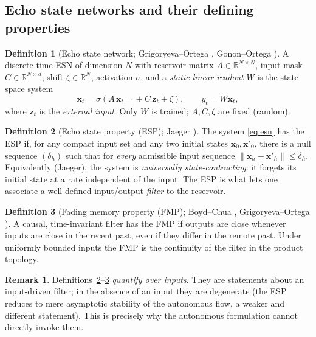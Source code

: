 \documentclass[11pt]{article}
\theoremstyle{definition}
\newtheorem{definition}{Definition}[section]
\newtheorem{remark}{Remark}[section]
\theoremstyle{plain}
\newcommand{\R}{\mathbb{R}}
\begin{document}
\subsection{Echo state networks and their defining properties}

\begin{definition}[Echo state network; Grigoryeva--Ortega \cite{grigoryeva2018}, Gonon--Ortega \cite{gonon2021}]
\label{def:esn}
A discrete-time ESN of dimension $N$ with reservoir matrix $A\in\R^{N\times N}$, input mask $C\in\R^{N\times d}$, shift $\zeta\in\R^N$, activation $\sigma$, and a \emph{static linear readout} $W$ is the state-space system
\begin{equation}
\label{eq:esn}
\mathbf{x}_t = \sigma\!\left(A\,\mathbf{x}_{t-1} + C\,\mathbf{z}_t + \zeta\right),\qquad
y_t = W\mathbf{x}_t,
\end{equation}
where $\mathbf{z}_t$ is the \emph{external input}. Only $W$ is trained; $A,C,\zeta$ are fixed (random).
\end{definition}

\begin{definition}[Echo state property (ESP); Jaeger \cite{jaeger2001}]
\label{def:esp}
The system \eqref{eq:esn} has the ESP if, for any compact input set and any two initial states $\mathbf{x}_0,\mathbf{x}'_0$, there is a null sequence $(\delta_h)$ such that for \emph{every} admissible input sequence $\|\mathbf{x}_h-\mathbf{x}'_h\|\le\delta_h$. Equivalently (Jaeger), the system is \emph{universally state-contracting}: it forgets its initial state at a rate independent of the input. The ESP is what lets one associate a well-defined input/output \emph{filter} to the reservoir.
\end{definition}

\begin{definition}[Fading memory property (FMP); Boyd--Chua \cite{boydchua1985}, Grigoryeva--Ortega \cite{grigoryeva2018}]
\label{def:fmp}
A causal, time-invariant filter has the FMP if outputs are close whenever inputs are close in the recent past, even if they differ in the remote past. Under uniformly bounded inputs the FMP is the continuity of the filter in the product topology.
\end{definition}

\begin{remark}
Definitions~\ref{def:esp}--\ref{def:fmp} \emph{quantify over inputs}. They are statements about an input-driven filter; in the absence of an input they are degenerate (the ESP reduces to mere asymptotic stability of the autonomous flow, a weaker and different statement). This is precisely why the autonomous formulation cannot directly invoke them.
\end{remark}
\end{document}
